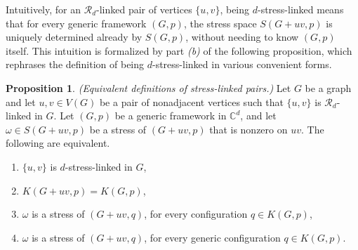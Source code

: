 \documentclass[11pt,a4paper,dvipsnames]{scrartcl}
\theoremstyle{definition}
\newtheorem{proposition}[theorem]{Proposition}
\newcommand{\CC}{\mathbb{C}}
\newcommand{\strongly}[1]{${#1}$-stress-linked}
\newcommand{\sharedstresskernel}[1]{K}
\begin{document}
Intuitively, for an $\mathcal{R}_d$-linked pair of vertices $\{u,v\}$, being $d$-stress-linked means that for every generic framework $(G,p)$, the stress space $S(G+uv,p)$ is uniquely determined already by $S(G,p)$, without needing to know $(G,p)$ itself. This intuition is formalized by part \emph{(b)} of the following proposition, which rephrases the definition of being \strongly{d} in various convenient forms. 
\begin{proposition}\label{lemma:def} \emph{(Equivalent definitions of stress-linked pairs.)}\newline
    Let $G$ be a graph and let $u,v \in V(G)$ be a pair of nonadjacent vertices such that $\{u,v\}$ is $\mathcal{R}_d$-linked in $G$. Let $(G,p)$ be a generic framework in $\CC^d$, and let $\omega \in S(G+uv,p)$ be a stress of $(G+uv,p)$ that is nonzero on $uv$. The following are equivalent.
    \begin{enumerate}
        \item $\{u,v\}$ is \strongly{d} in $G$,
        \item $\sharedstresskernel{d}(G+uv,p) = \sharedstresskernel{d}(G,p)$,
        \item $\omega$ is a stress of $(G+uv,q)$, for every configuration $q \in \sharedstresskernel{d}(G,p)$,
        \item $\omega$ is a stress of $(G+uv,q)$, for every generic configuration $q \in \sharedstresskernel{d}(G,p)$.
    \end{enumerate}
\end{proposition}
\end{document}
